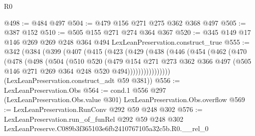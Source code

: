 \begin{lexlean}{R0}
\begin{coremodule}
@498 := @484 @497
@504 := @479 @156 @271 @275 @362 @368 @497
@505 := @387 @152
@510 := @505 @155 @271 @274 @364 @367
@520 := @345 @149 @17 @146 @269 @269 @248 @364 @494 LexLeanPreservation.construct_true
@555 := @342
    (@384
      (@399
        (@407
          (@415
            (@423
              (@429
                (@438
                  (@446
                    (@454
                      (@462
                        (@470
                          (@478
                            (@498
                              (@504
                                (@510
                                  @520
                                  (@479
                                    @154
                                    @271
                                    @273
                                    @362
                                    @366
                                    @497
                                    (@505 @146 @271 @269 @364 @248 @520 @494))))))))))))))))
      (LexLeanPreservation.construct_adt @59 @381))
@556 := LexLeanPreservation.Obs
@564 := cond.{1} @556 @297 (LexLeanPreservation.Obs.value @301) LexLeanPreservation.Obs.overflow
@569 := LexLeanPreservation.RunConv @292 @59 @248 @302
@576 := LexLeanPreservation.run_of_funRel
    @292
    @59
    @248
    @302
    LexLeanPreserve.C089b3f365103e6fb2410767105a32c5b.R0.__rel_0
\end{coremodule}
\end{lexlean}

